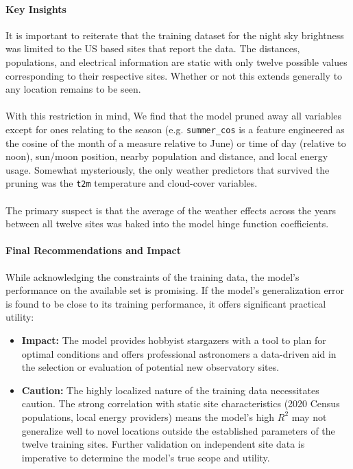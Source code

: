 \documentclass[11 pt]{article}  %
\begin{document}
\paragraph{Key Insights} It is important to reiterate that the training dataset
for the night sky brightness was limited to the US based sites that report the 
data. The distances, populations, and electrical information are static with only
twelve possible values corresponding to their respective sites. Whether or not this
extends generally to any location remains to be seen. 

\paragraph{} With this restriction in mind,
We find that the model pruned away all variables except for ones relating to the
season (e.g. \texttt{summer\_cos} is a feature engineered as the cosine of the month of
a measure relative to June) or time of day (relative to noon), sun/moon position, 
nearby population and distance, and local energy usage. Somewhat mysteriously, 
the only weather predictors that survived the pruning was the \texttt{t2m} 
temperature and cloud-cover variables. 

\paragraph{}The primary suspect is that the average of the weather effects 
across the years between all twelve sites was baked into the model hinge function 
coefficients.

\paragraph{Final Recommendations and Impact} While acknowledging the constraints 
of the training data, the model's performance on the available set is promising. 
If the model's generalization error is found to be close to its training performance, 
it offers significant practical utility:

\begin{itemize}[label=--]
    \item \textbf{Impact:} The model provides hobbyist stargazers with a tool to 
    plan for optimal conditions and offers professional astronomers a data-driven 
    aid in the selection or evaluation of potential new observatory sites.
    \item \textbf{Caution:} The highly localized nature of the training data 
    necessitates caution. The strong correlation with static site characteristics 
    (2020 Census populations, local energy providers) means the model's high 
    $R^2$ may not generalize well to novel locations outside the established 
    parameters of the twelve training sites. Further validation on independent 
    site data is imperative to determine the model's true scope and utility.
\end{itemize}

\pagebreak
\printbibliography
\end{document}
